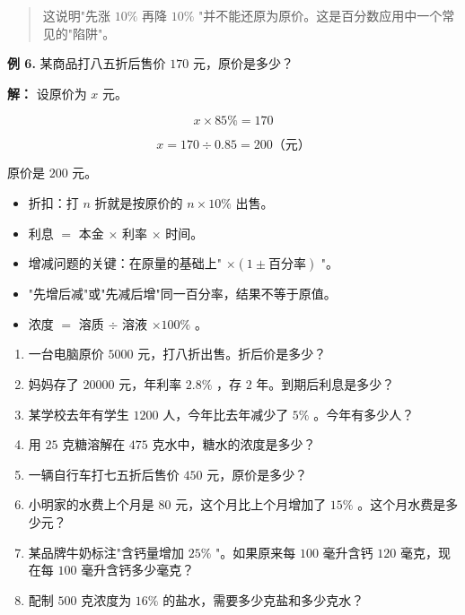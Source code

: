 \begin{quote}
这说明"先涨 $10\%$ 再降 $10\%$ "并不能还原为原价。这是百分数应用中一个常见的"陷阱"。
\end{quote}


\textbf{例 6.} 某商品打八五折后售价 $170$ 元，原价是多少？

\textbf{解：} 设原价为 $x$ 元。

\[
x \times 85\% = 170
\]


\[
x = 170 \div 0.85 = 200 \text{（元）}
\]


原价是 $200$ 元。

\begin{keytakeaway}


\begin{itemize}
  \item 折扣：打 $n$ 折就是按原价的 $n \times 10\%$ 出售。
  \item 利息 $=$ 本金 $\times$ 利率 $\times$ 时间。
  \item 增减问题的关键：在原量的基础上" $\times (1 \pm \text{百分率})$ "。
  \item "先增后减"或"先减后增"同一百分率，结果不等于原值。
  \item 浓度 $=$ 溶质 $\div$ 溶液 $\times 100\%$ 。
\end{itemize}


\end{keytakeaway}

\begin{practice}


\begin{enumerate}
  \item 一台电脑原价 $5000$ 元，打八折出售。折后价是多少？
  \item 妈妈存了 $20000$ 元，年利率 $2.8\%$ ，存 $2$ 年。到期后利息是多少？
  \item 某学校去年有学生 $1200$ 人，今年比去年减少了 $5\%$ 。今年有多少人？
  \item 用 $25$ 克糖溶解在 $475$ 克水中，糖水的浓度是多少？
  \item 一辆自行车打七五折后售价 $450$ 元，原价是多少？
  \item 小明家的水费上个月是 $80$ 元，这个月比上个月增加了 $15\%$ 。这个月水费是多少元？
  \item 某品牌牛奶标注"含钙量增加 $25\%$ "。如果原来每 $100$ 毫升含钙 $120$ 毫克，现在每 $100$ 毫升含钙多少毫克？
  \item 配制 $500$ 克浓度为 $16\%$ 的盐水，需要多少克盐和多少克水？
\end{enumerate}


\end{practice}



